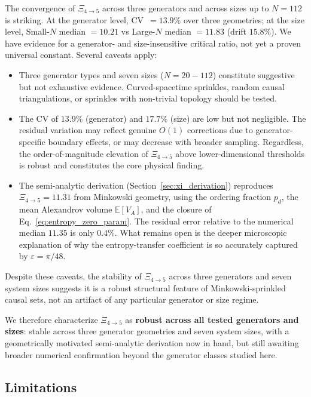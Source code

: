 \documentclass[12pt,a4paper]{article}
\begin{document}
The convergence of $\Xi_{4 \to 5}$ across three generators and across sizes up to $N = 112$
is striking. At the generator level, CV~$= 13.9\%$ over three geometries;
at the size level, Small-$N$ median $= 10.21$ vs Large-$N$ median $= 11.83$ (drift $15.8\%$).
We have evidence for a generator- and size-insensitive critical ratio,
not yet a proven universal constant. Several caveats apply:

\begin{itemize}
  \item Three generator types and seven sizes ($N = 20{-}112$) constitute suggestive
    but not exhaustive evidence. Curved-spacetime sprinkles, random causal triangulations,
    or sprinkles with non-trivial topology should be tested.
  \item The CV of $13.9\%$ (generator) and $17.7\%$ (size) are low but not negligible.
    The residual variation may reflect genuine $O(1)$ corrections due to
    generator-specific boundary effects, or may decrease with broader sampling.
    Regardless, the order-of-magnitude elevation of $\Xi_{4 \to 5}$ above
    lower-dimensional thresholds is robust and constitutes the core physical finding.
  \item The semi-analytic derivation (Section~\ref{sec:xi_derivation}) reproduces
    $\Xi_{4 \to 5} = 11.31$ from Minkowski geometry, using the ordering fraction
    $p_d$, the mean Alexandrov volume $\mathbb{E}[V_A]$, and the closure
    of Eq.~\eqref{eq:entropy_zero_param}. The residual error relative to the numerical
    median $11.35$ is only $0.4\%$. What remains open is the deeper microscopic
    explanation of why the entropy-transfer coefficient is so accurately captured
    by $\varepsilon = \pi/48$.
\end{itemize}

Despite these caveats, the stability of $\Xi_{4 \to 5}$ across three generators
and seven system sizes suggests it is a robust structural feature of
Minkowski-sprinkled causal sets, not an artifact of any particular generator or size regime.

We therefore characterize $\Xi_{4 \to 5}$ as \textbf{robust across all tested generators
and sizes}: stable across three generator geometries and seven system sizes,
with a geometrically motivated semi-analytic derivation now in hand,
but still awaiting broader numerical confirmation beyond the generator classes
studied here.

\subsection{Limitations}
\label{sec:limitations}
\end{document}
